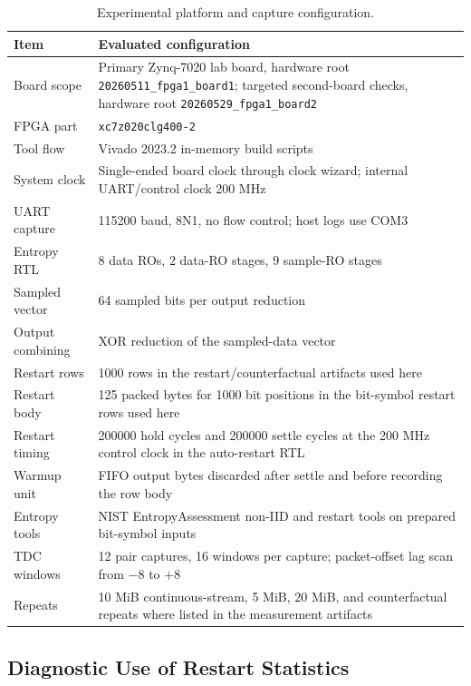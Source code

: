 \documentclass[journal]{IEEEtran}
\newcommand{\tdc}{TDC}
\begin{document}
\begin{table}[t]
\centering
\caption{Experimental platform and capture configuration.}
\label{tab:setup}
\footnotesize
\begin{tabular}{@{}L{0.35\columnwidth}L{0.57\columnwidth}@{}}
\toprule
Item & Evaluated configuration \\
\midrule
Board scope & Primary Zynq-7020 lab board, hardware root \texttt{20260511\_fpga1\_board1}; targeted second-board checks, hardware root \texttt{20260529\_fpga1\_board2} \\
FPGA part & \texttt{xc7z020clg400-2} \\
Tool flow & Vivado 2023.2 in-memory build scripts \\
System clock & Single-ended board clock through clock wizard; internal UART/control clock 200 MHz \\
UART capture & 115200 baud, 8N1, no flow control; host logs use COM3 \\
Entropy RTL & 8 data ROs, 2 data-RO stages, 9 sample-RO stages \\
Sampled vector & 64 sampled bits per output reduction \\
Output combining & XOR reduction of the sampled-data vector \\
Restart rows & 1000 rows in the restart/counterfactual artifacts used here \\
Restart body & 125 packed bytes for 1000 bit positions in the bit-symbol restart rows used here \\
Restart timing & 200000 hold cycles and 200000 settle cycles at the 200 MHz control clock in the auto-restart RTL \\
Warmup unit & FIFO output bytes discarded after settle and before recording the row body \\
Entropy tools & NIST EntropyAssessment non-IID and restart tools on prepared bit-symbol inputs \\
\tdc{} windows & 12 pair captures, 16 windows per capture; packet-offset lag scan from $-8$ to $+8$ \\
Repeats & 10 MiB continuous-stream, 5 MiB, 20 MiB, and counterfactual repeats where listed in the measurement artifacts \\
\bottomrule
\end{tabular}
\end{table}

\subsection{Diagnostic Use of Restart Statistics}
\end{document}
